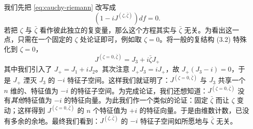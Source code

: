 我们先把 \eqref{eq:cauchy-riemann} 改写成
\begin{equation} \label{eq:holomorphy}
(1 - i J^{(\zeta,\bar\zeta)}) df = 0.
\end{equation}
若把 $\zeta$ 与 $\bar\zeta$ 看作彼此独立的复变量，那么这个方程其实与 $\bar\zeta$ 无关。为看出这一点，只需在一个固定的 $\zeta$ 处论证即可，例如取 $\zeta=0$。将一般的复结构 (3.2) 特殊化到 $\zeta=0$，%
\begin{equation}
J^{(\zeta=0,\bar\zeta)} = J_3 + i \bar\zeta J_+
\end{equation}
其中我们引入了 $J_+ = J_1 + i J_2$。其次注意 $J_+ J_3 = i J_+$，故 $J_+ (J_3 - i) = 0$，于是 $J_+$ 湮灭 $J_3$ 的 $-i$ 特征子空间。这样我们就证明了：$J^{(\zeta=0,\bar\zeta)}$ 与 $J_3$ 共享一个 $n$ 维的、特征值为 $-i$ 的特征子空间。为完成论证，我们还想知道：$J^{(\zeta=0,\bar\zeta)}$ 没有\emph{其他}特征值为 $-i$ 的特征向量。为此我们作一个类似的论证：固定 $\bar\zeta$ 而让 $\zeta$ 变动；这样得到 $J^{(\zeta=0,\bar\zeta)}$ 的 $n$ 个特征值为 $+i$ 的特征向量。于是由维数计数，已没有多余的余地。最终我们看到：$J^{(\zeta,\bar\zeta)}$ 的 $-i$ 特征子空间如所愿地与 $\bar\zeta$ 无关。

